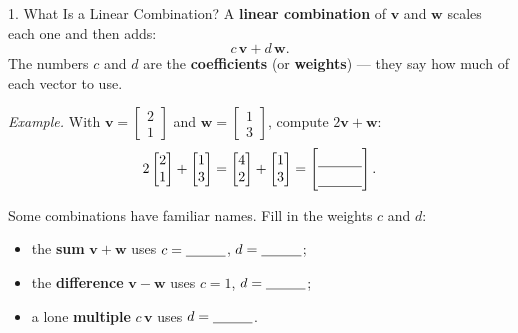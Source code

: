 \documentclass[10pt]{article}
\newcommand{\vv}{\mathbf{v}}
\newcommand{\ww}{\mathbf{w}}
\begin{document}
\begin{notesbox}{1. What Is a Linear Combination?}
A \textbf{linear combination} of $\vv$ and $\ww$ scales each one and then adds:
\[
  c\,\vv + d\,\ww .
\]
The numbers $c$ and $d$ are the \textbf{coefficients} (or \textbf{weights}) --- they say how
much of each vector to use.

\vspace{2pt}
\textit{Example.} With $\vv = \begin{bmatrix} 2 \\ 1 \end{bmatrix}$ and
$\ww = \begin{bmatrix} 1 \\ 3 \end{bmatrix}$, compute $2\vv + \ww$:
\[
  2\begin{bmatrix} 2 \\ 1 \end{bmatrix} + \begin{bmatrix} 1 \\ 3 \end{bmatrix}
  = \begin{bmatrix} 4 \\ 2 \end{bmatrix} + \begin{bmatrix} 1 \\ 3 \end{bmatrix}
  = \begin{bmatrix}\rule{0pt}{1.1em}\blank{1.1cm}\\[2pt]\blank{1.1cm}\end{bmatrix}.
\]

Some combinations have familiar names. Fill in the weights $c$ and $d$:
\begin{itemize}\setlength{\itemsep}{2pt}
  \item the \textbf{sum} $\vv+\ww$ uses $c=\blank{1.0cm}$, $d=\blank{1.0cm}$;
  \item the \textbf{difference} $\vv-\ww$ uses $c=1$, $d=\blank{1.0cm}$;
  \item a lone \textbf{multiple} $c\,\vv$ uses $d=\blank{1.0cm}$.
\end{itemize}
\end{notesbox}
\end{document}
